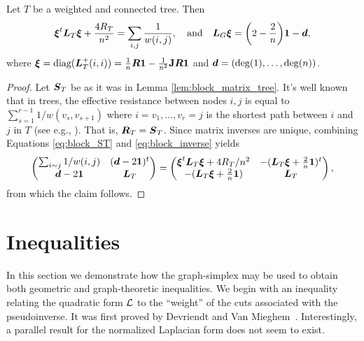 \begin{corollary}
	Let $T$  be a weighted and connected tree. Then 
	\begin{equation*}
	\vb*{\xi}^t \vb*{L}_T\vb*{\xi} + \frac{4R_T}{n^2} = \sum_{i,j}  \frac{1}{w(i,j)}, \quad \text{and}\quad \vb*{L}_G\vb*{\xi} = \bigg(2-\frac{2}{n}\bigg)\vb{1} - \vb*{d},
	\end{equation*}
	where $\vb*{\xi} = \text{diag}(\vb*{L}_T^+(i,i))=\frac{1}{n}\vb*{R}\vb{1} - \frac{1}{n^2} \vb{J} \vb*{R}\vb{1}$ and $\vb*{d}= (\deg(1),\dots,\deg(n))$. 
\end{corollary}
\begin{proof}
	Let $\vb*{S}_T$ be as it was in  Lemma \ref{lem:block_matrix_tree}. It's well known  that in trees, the effective resistance between nodes $i,j$  is equal to $\sum_{s=1}^{r-1} 1/w(v_s,v_{s+1})$ where $i=v_1,\dots,v_r=j$ is the shortest path between $i$ and $j$ in $T$ (see e.g., \cite{ellens2011effective}). That is, $\vb*{R}_T=\vb*{S}_T$. Since matrix inverses are unique, combining Equations \eqref{eq:block_ST} and \eqref{eq:block_inverse} yields 
	\begin{equation*}
	\begin{pmatrix}
	\sum_{i\sim j}1/w(i,j)  & (\vb*{d}-2\vb{1})^t \\
	\vb*{d}-2\vb{1} & \vb*{L}_T
	\end{pmatrix} = \begin{pmatrix}
\vb*{\xi}^t  \vb*{L}_T \vb*{\xi}  + 4R_T/n^2
	&  -(\vb*{L}_T\vb*{\xi} + \frac{2}{n}\vb{1} )^t \\
	-(\vb*{L}_T\vb*{\xi} + \frac{2}{n}\vb{1} ) 
	& \vb*{L}_T
	\end{pmatrix},
	\end{equation*}  
	from which the claim follows. 
\end{proof}






\section{Inequalities}
\label{sec:inequalities}
In this section we demonstrate how the graph-simplex may be used to obtain both geometric and graph-theoretic inequalities. We begin with an inequality relating the quadratic form $\mathcal{L}$ to the ``weight'' of the cuts associated with the pseudoinverse.  It was first proved by Devriendt and Van Mieghem~\cite{devriendt2018simplex}. Interestingly, a parallel result for the normalized Laplacian form does not seem to exist. 

